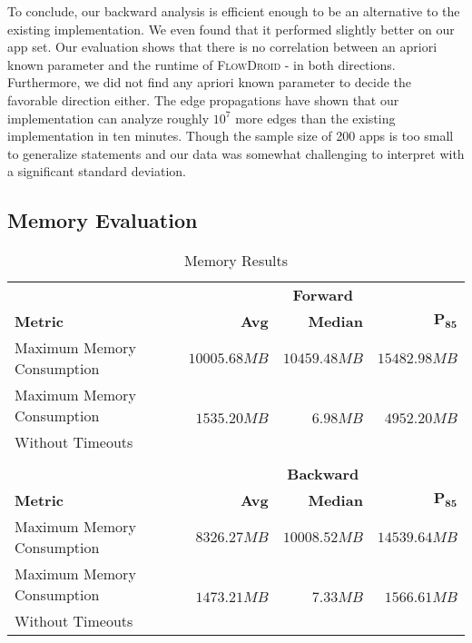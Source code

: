 \documentclass[../draft.tex]{subfiles}
\begin{document}
    To conclude, our backward analysis is efficient enough to be an alternative to the existing implementation.
    We even found that it performed slightly better on our app set.
    Our evaluation shows that there is no correlation between an apriori known parameter and the runtime of \textsc{FlowDroid} - in both directions.
    Furthermore, we did not find any apriori known parameter to decide the favorable direction either.
    The edge propagations have shown that our implementation can analyze roughly $10^7$ more edges than the existing implementation in ten minutes. Though the sample size of 200 apps is too small to generalize statements and our data was somewhat challenging to interpret with a significant standard deviation.

    \FloatBarrier
    \subsection{Memory Evaluation}\label{s:memex}

    \begin{table}[tbp]
        \centering
        \begin{tabular}{l | r | r | r}
            & \multicolumn{3}{c}{\textbf{Forward}}\\
            \textbf{Metric} & \textbf{Avg} & \textbf{Median} & $\mathbf{P_{85}}$\\
            \hline\hline
            Maximum Memory Consumption & $10005.68MB$ & $10459.48MB$ & $15482.98MB$\\
            \hline
            Maximum Memory Consumption & \multirow{2}{*}{$1535.20MB$} & \multirow{2}{*}{$6.98MB$} & \multirow{2}{*}{$4952.20MB$}\\
            Without Timeouts & & &\\            
            \multicolumn{4}{c}{}\\
            & \multicolumn{3}{c}{\textbf{Backward}}\\
            \textbf{Metric} & \textbf{Avg} & \textbf{Median} & $\mathbf{P_{85}}$\\
            \hline\hline
            Maximum Memory Consumption & $8326.27MB$ & $10008.52MB$ & $14539.64MB$\\
            \hline
            Maximum Memory Consumption & \multirow{2}{*}{$1473.21MB$} & \multirow{2}{*}{$7.33MB$} & \multirow{2}{*}{$1566.61MB$}\\
            Without Timeouts & & &\\
        \end{tabular}
        \caption{Memory Results}
        \label{t:memres}
    \end{table}
\end{document}
